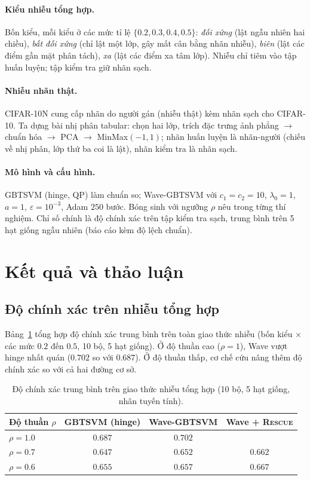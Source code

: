\documentclass[11pt,a4paper]{article}
\newcommand{\R}{\textsc{Rescue}}
\begin{document}
\paragraph{Kiểu nhiễu tổng hợp.} Bốn kiểu, mỗi kiểu ở các mức tỉ lệ $\{0.2,0.3,0.4,0.5\}$: \emph{đối xứng} (lật ngẫu nhiên hai chiều), \emph{bất đối xứng} (chỉ lật một lớp, gây mất cân bằng nhãn nhiễu), \emph{biên} (lật các điểm gần mặt phân tách), \emph{xa} (lật các điểm xa tâm lớp). Nhiễu chỉ tiêm vào tập huấn luyện; tập kiểm tra giữ nhãn sạch.

\paragraph{Nhiễu nhãn thật.} CIFAR-10N \cite{cifar10n} cung cấp nhãn do người gán (nhiễu thật) kèm nhãn sạch cho CIFAR-10. Ta dựng bài nhị phân tabular: chọn hai lớp, trích đặc trưng ảnh phẳng $\to$ chuẩn hóa $\to$ PCA $\to$ MinMax$(-1,1)$; nhãn huấn luyện là nhãn-người (chiếu về nhị phân, lớp thứ ba coi là lật), nhãn kiểm tra là nhãn sạch.

\paragraph{Mô hình và cấu hình.} GBTSVM (hinge, QP) làm chuẩn so; Wave-GBTSVM với $c_1=c_2=10$, $\lambda_0=1$, $a=1$, $\varepsilon=10^{-3}$, Adam $250$ bước. Bóng sinh với ngưỡng $\rho$ nêu trong từng thí nghiệm. Chỉ số chính là độ chính xác trên tập kiểm tra sạch, trung bình trên 5 hạt giống ngẫu nhiên (báo cáo kèm độ lệch chuẩn).

\section{Kết quả và thảo luận}
\label{sec:results}

\subsection{Độ chính xác trên nhiễu tổng hợp}
Bảng~\ref{tab:synth} tổng hợp độ chính xác trung bình trên toàn giao thức nhiễu (bốn kiểu $\times$ các mức $0.2$ đến $0.5$, 10 bộ, 5 hạt giống). Ở độ thuần cao ($\rho=1$), Wave vượt hinge nhất quán ($0.702$ so với $0.687$). Ở độ thuần thấp, cơ chế cứu nâng thêm độ chính xác so với cả hai đường cơ sở.

\begin{table}[h]
\centering
\caption{Độ chính xác trung bình trên giao thức nhiễu tổng hợp (10 bộ, 5 hạt giống, nhân tuyến tính).}
\label{tab:synth}
\begin{tabular}{lccc}
\toprule
Độ thuần $\rho$ & GBTSVM (hinge) & Wave-GBTSVM & Wave + \R{} \\
\midrule
$\rho=1.0$ & $0.687$ & $\mathbf{0.702}$ & \\
$\rho=0.7$ & $0.647$ & $0.652$ & $\mathbf{0.662}$ \\
$\rho=0.6$ & $0.655$ & $0.657$ & $\mathbf{0.667}$ \\
\bottomrule
\end{tabular}
\end{table}
\end{document}
